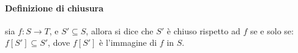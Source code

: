 \documentclass{article}
\begin{document}
\paragraph{Definizione di chiusura} sia $f: S \to T$, e $S'\subseteq S$, allora si dice che $S'$ è chiuso rispetto ad $f$ se e solo se:
$f[S'] \subseteq S'$, dove $f[S']$ è l'immagine di $f$ in $S$.\\
\begin{comment}
Quindi voglio dimostrare che $f[U] \subseteq U$. Dimostro che: 
\begin{itemize}
    \item[\textbf{a}] $s \sqsubseteq f(s)$
    \item[\textbf{b}] $\forall x \in U$ $s \sqsubseteq f(x)$
\end{itemize}

\paragraph{a} $\forall e \in S$ vale che $ e \sqsubseteq s$ per definizione di lub. Dato che $S$ è un sottoinsieme dei punti fissi vale che $ e = f(e)$ e per monotonia di $f $ vale che $f(e) \sqsubseteq f(s) \implies \forall e \in S. e \sqsubseteq f(s)$, ovvero $f(s)$ è un upper bound di S, ma per definizione di least upper bound si ha che $s \sqsubseteq f(s)$.

\paragraph{b} $\forall x \in  U$ $s \sqsubseteq x$ per definizione di $U$. Per monotonia di $f$: $f(s) \sqsubseteq f(x)$, per \textbf{a} $s \sqsubseteq f(s) \implies s \sqsubseteq f(x) \forall x \in U$. \\\\

 Per \textbf{a} e \textbf{b} $\implies \forall x \in U $ $f(x) \in U$. Ovvero $U$ è chiuso rispetto ad $f$.


Siccome $f: U \to U $ e U è un reticolo completo in quanto intervallo di un reticolo completo ($L$), e per \textbf{Punto 1} e \textbf{Punto 2} vale che $f:U \to U$ con $U$ reticolo completo ha lub e glb  in U $\implies f$ ha lub e glb in $U$ e lub=greatest fixed point e glb=least fixed point di $f$ in U.


Siccome $s \sqsubseteq x \forall x \in U$ allora s è il greatest lower bound di U, quindi s = least fixed point di $f$ in $U$. Allora $S$ ha lub in $F$ perchè il lub di $S = s =$ least fixed point di $f$ in $U$ e quindi $\in F$.\\

Analogamente i può dimostrare che $S$ ha glb in $F$, e siccome questo vale $\forall S \subseteq P \implies P$ è un reticolo completo

\end{comment}
\end{document}

